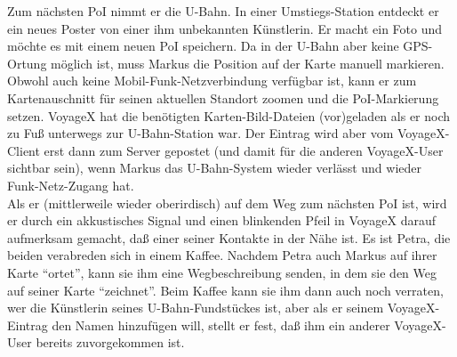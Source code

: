 Zum nächsten PoI nimmt er die U-Bahn. In einer Umstiegs-Station entdeckt er ein neues Poster von einer ihm unbekannten Künstlerin. Er macht ein Foto und möchte es mit einem neuen PoI speichern. Da in der U-Bahn aber keine GPS-Ortung möglich ist, muss Markus die Position auf der Karte manuell markieren. Obwohl auch keine Mobil-Funk-Netzverbindung verfügbar ist, kann er zum Kartenauschnitt für seinen aktuellen Standort zoomen und die PoI-Markierung setzen. VoyageX hat die benötigten Karten-Bild-Dateien (vor)geladen als er noch zu Fuß unterwegs zur U-Bahn-Station war. Der Eintrag wird aber vom VoyageX-Client erst dann zum Server gepostet (und damit für die anderen VoyageX-User sichtbar sein), wenn Markus das U-Bahn-System wieder verlässt und wieder Funk-Netz-Zugang hat.\\
Als er (mittlerweile wieder oberirdisch) auf dem Weg zum nächsten PoI ist, wird er durch ein akkustisches Signal und einen blinkenden Pfeil in VoyageX darauf aufmerksam gemacht, daß einer seiner Kontakte in der Nähe ist. Es ist Petra, die beiden verabreden sich in einem Kaffee. Nachdem Petra auch Markus auf ihrer Karte "`ortet"', kann sie ihm eine Wegbeschreibung senden, in dem sie den Weg auf seiner Karte "`zeichnet"'.
Beim Kaffee kann sie ihm dann auch noch verraten, wer die Künstlerin seines U-Bahn-Fundstückes ist, aber als er seinem VoyageX-Eintrag den Namen hinzufügen will, stellt er fest, daß ihm ein anderer VoyageX-User bereits zuvorgekommen ist.%

